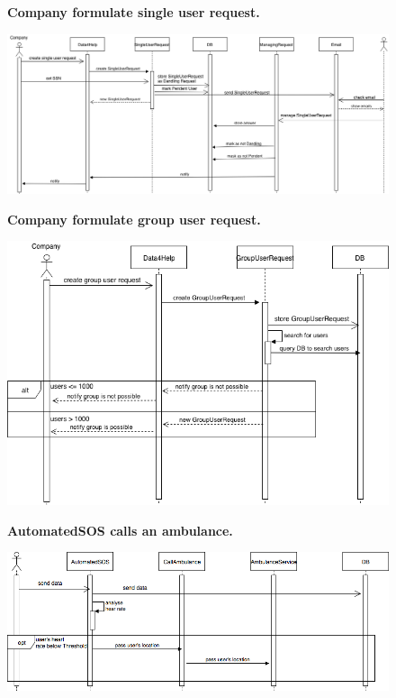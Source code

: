 \documentclass{article}
\begin{document}
\begin{figure}[h!]
\centering
    \textbf{Company formulate single user request.}\par\medskip
	\includegraphics[width= \linewidth]{singlerequest.png}
\end{figure}\newpage
\begin{figure}[h!]
\centering
    \textbf{Company formulate group user request.}\par\medskip
	\includegraphics[width= \linewidth]{grouprequest.png}
\end{figure}\newpage
\begin{figure}[h!]
\centering
    \textbf{AutomatedSOS calls an ambulance.}\par\medskip
	\includegraphics[width= \linewidth]{callambulance.png}
\end{figure}\newpage
\end{document}
